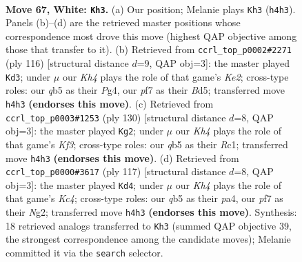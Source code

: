 \documentclass[11pt]{article}
\begin{document}
\clearpage

\begin{figure}[p]\centering
\begin{subfigure}{0.46\textwidth}\centering
\resizebox{\linewidth}{!}{%
\newchessgame
\chessboard[
  setfen={7b/5pk1/3P4/1q6/7K/8/8/8 w - - 3 67},
  showmover=false,
  pgfstyle=straightmove, color=movearrow, markmove={h4-h3}
]}
\caption{}
\end{subfigure}\hfill
\begin{subfigure}{0.46\textwidth}\centering
\resizebox{\linewidth}{!}{%
\newchessgame
\chessboard[
  setfen={8/6p1/8/b2B2p1/1k4P1/8/4K3/8 w - - 8 59},
  showmover=false,
  pgfstyle=straightmove, color=movearrow, markmove={e2-d3}
]}
\caption{}
\end{subfigure}
\\[4pt]
\begin{subfigure}{0.46\textwidth}\centering
\resizebox{\linewidth}{!}{%
\newchessgame
\chessboard[
  setfen={8/8/3p1bp1/6k1/8/5K2/8/2R5 w - - 6 66},
  showmover=false,
  pgfstyle=straightmove, color=movearrow, markmove={f3-g2}
]}
\caption{}
\end{subfigure}\hfill
\begin{subfigure}{0.46\textwidth}\centering
\resizebox{\linewidth}{!}{%
\newchessgame
\chessboard[
  setfen={6K1/7B/8/p1k5/P7/8/6n1/8 b - - 2 59},
  showmover=false,
  pgfstyle=straightmove, color=movearrow, markmove={c5-d4}
]}
\caption{}
\end{subfigure}
\caption{\textbf{Move 67, White: \texttt{Kh3}.} (a) Our position; Melanie plays \texttt{Kh3} (\texttt{h4h3}). Panels (b)--(d) are the retrieved master positions whose correspondence most drove this move (highest QAP objective among those that transfer to it). (b) Retrieved from \texttt{ccrl\_top\_p0002\#2271} (ply 116) [structural distance $d$=9, QAP obj=3]: the master played \texttt{Kd3}; under $\mu$ our \emph{Kh4} plays the role of that game's \emph{Ke2}; cross-type roles: our \emph{q}b5 as their \emph{P}g4, our \emph{p}f7 as their \emph{B}d5; transferred move \texttt{h4h3} \textbf{(endorses this move)}. (c) Retrieved from \texttt{ccrl\_top\_p0003\#1253} (ply 130) [structural distance $d$=8, QAP obj=3]: the master played \texttt{Kg2}; under $\mu$ our \emph{Kh4} plays the role of that game's \emph{Kf3}; cross-type roles: our \emph{q}b5 as their \emph{R}c1; transferred move \texttt{h4h3} \textbf{(endorses this move)}. (d) Retrieved from \texttt{ccrl\_top\_p0000\#3617} (ply 117) [structural distance $d$=8, QAP obj=3]: the master played \texttt{Kd4}; under $\mu$ our \emph{Kh4} plays the role of that game's \emph{Kc4}; cross-type roles: our \emph{q}b5 as their \emph{p}a4, our \emph{p}f7 as their \emph{N}g2; transferred move \texttt{h4h3} \textbf{(endorses this move)}. Synthesis: 18 retrieved analogs transferred to \texttt{Kh3} (summed QAP objective 39, the strongest correspondence among the candidate moves); Melanie committed it via the \texttt{search} selector.}
\label{fig:thought-m132}
\end{figure}
\end{document}
